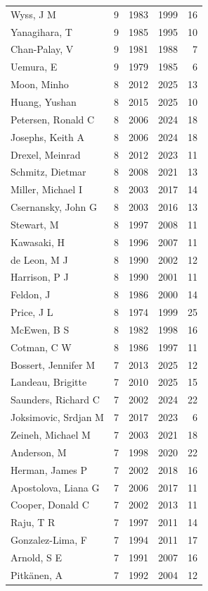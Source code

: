 \documentclass{../latex/analysis_report}
\begin{document}
\begin{longtable}{lrrrr}
Wyss, J M & 9 & 1983 & 1999 & 16 \\
Yanagihara, T & 9 & 1985 & 1995 & 10 \\
Chan-Palay, V & 9 & 1981 & 1988 & 7 \\
Uemura, E & 9 & 1979 & 1985 & 6 \\
Moon, Minho & 8 & 2012 & 2025 & 13 \\
Huang, Yushan & 8 & 2015 & 2025 & 10 \\
Petersen, Ronald C & 8 & 2006 & 2024 & 18 \\
Josephs, Keith A & 8 & 2006 & 2024 & 18 \\
Drexel, Meinrad & 8 & 2012 & 2023 & 11 \\
Schmitz, Dietmar & 8 & 2008 & 2021 & 13 \\
Miller, Michael I & 8 & 2003 & 2017 & 14 \\
Csernansky, John G & 8 & 2003 & 2016 & 13 \\
Stewart, M & 8 & 1997 & 2008 & 11 \\
Kawasaki, H & 8 & 1996 & 2007 & 11 \\
de Leon, M J & 8 & 1990 & 2002 & 12 \\
Harrison, P J & 8 & 1990 & 2001 & 11 \\
Feldon, J & 8 & 1986 & 2000 & 14 \\
Price, J L & 8 & 1974 & 1999 & 25 \\
McEwen, B S & 8 & 1982 & 1998 & 16 \\
Cotman, C W & 8 & 1986 & 1997 & 11 \\
Bossert, Jennifer M & 7 & 2013 & 2025 & 12 \\
Landeau, Brigitte & 7 & 2010 & 2025 & 15 \\
Saunders, Richard C & 7 & 2002 & 2024 & 22 \\
Joksimovic, Srdjan M & 7 & 2017 & 2023 & 6 \\
Zeineh, Michael M & 7 & 2003 & 2021 & 18 \\
Anderson, M & 7 & 1998 & 2020 & 22 \\
Herman, James P & 7 & 2002 & 2018 & 16 \\
Apostolova, Liana G & 7 & 2006 & 2017 & 11 \\
Cooper, Donald C & 7 & 2002 & 2013 & 11 \\
Raju, T R & 7 & 1997 & 2011 & 14 \\
Gonzalez-Lima, F & 7 & 1994 & 2011 & 17 \\
Arnold, S E & 7 & 1991 & 2007 & 16 \\
Pitkänen, A & 7 & 1992 & 2004 & 12 \\

\end{longtable}
\end{document}
